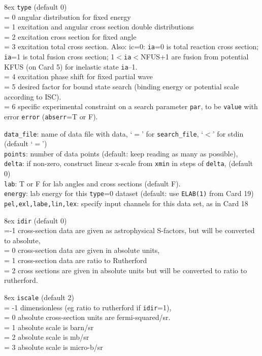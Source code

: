 \documentclass[11pt]{article}
\begin{document}
\hangindent 8ex
{\tt type} (default 0)
\\ = 0 angular distribution for fixed energy
\\ = 1 excitation and angular cross section double distributions
\\ = 2 excitation cross section for fixed angle
\\ = 3 excitation total cross section. Also: ic=0: {\tt ia}=0 is total reaction cross section;
{\tt ia}=1 is total fusion cross section; 1$<${\tt ia}$<$NFUS+1 are fusion from potential
KFUS (on Card 5) for inelastic state {\tt ia}--1.
\\ = 4 excitation phase shift for fixed partial wave
\\ = 5 desired factor for bound state search (binding energy or potential scale
 according to ISC).
\\ = 6 specific experimental constraint on a search parameter {\tt par},
    to be {\tt value} with error {\tt error} ({\tt abserr}=T or F).


{\tt data\_file}: name of data file with data, `$=$' for {\tt search\_file},
 `$<$' for stdin (default `$=$')\\
{\tt points}: number of data points (default: keep reading as many as possible),
\\
{\tt delta}: if non-zero, construct linear x-scale from {\tt xmin} in steps of {\tt delta},
 (default 0)\\
{\tt lab}: T or F for lab angles and cross sections (default F).\\
{\tt energy}: lab energy for this {\tt type}=0 dataset (default: use {\tt ELAB(1)} from Card 19)\\
{\tt pel,exl,labe,lin,lex}: specify input channels for this data set, as in Card 18

\hangindent 8ex
{\tt idir} (default 0)
\\ =-1 cross-section data are given as astrophysical S-factors, but will be converted to absolute,
\\ = 0 cross-section data are given in absolute units,
\\ = 1 cross-section data are ratio to Rutherford
\\ = 2 cross sections are given in absolute units but will be
         converted to ratio to rutherford.



\hangindent 8ex
{\tt iscale} (default 2)
\\ = -1 dimensionless (eg ratio to rutherford if {\tt idir}=1),
\\ = 0 absolute cross-section units are fermi-squared/sr.
\\ = 1 absolute scale is barn/sr
\\ = 2 absolute scale is mb/sr
\\ = 3 absolute scale is micro-b/sr
\end{document}
